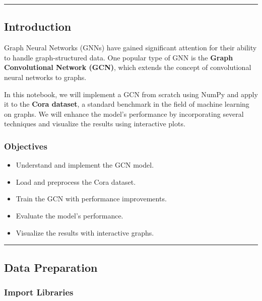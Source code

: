 \documentclass[11pt]{article}
\providecommand{\tightlist}{%
      \setlength{\itemsep}{0pt}\setlength{\parskip}{0pt}}
\begin{document}
\begin{center}\rule{0.5\linewidth}{0.5pt}\end{center}

\subsection{Introduction}\label{introduction}

Graph Neural Networks (GNNs) have gained significant attention for their
ability to handle graph-structured data. One popular type of GNN is the
\textbf{Graph Convolutional Network (GCN)}, which extends the concept of
convolutional neural networks to graphs.

In this notebook, we will implement a GCN from scratch using NumPy and
apply it to the \textbf{Cora dataset}, a standard benchmark in the field
of machine learning on graphs. We will enhance the model's performance
by incorporating several techniques and visualize the results using
interactive plots.

\subsubsection{Objectives}\label{objectives}

\begin{itemize}
\tightlist
\item
  Understand and implement the GCN model.
\item
  Load and preprocess the Cora dataset.
\item
  Train the GCN with performance improvements.
\item
  Evaluate the model's performance.
\item
  Visualize the results with interactive graphs.
\end{itemize}

\begin{center}\rule{0.5\linewidth}{0.5pt}\end{center}

\subsection{Data Preparation}\label{data-preparation}

\subsubsection{Import Libraries}\label{import-libraries}
\end{document}
